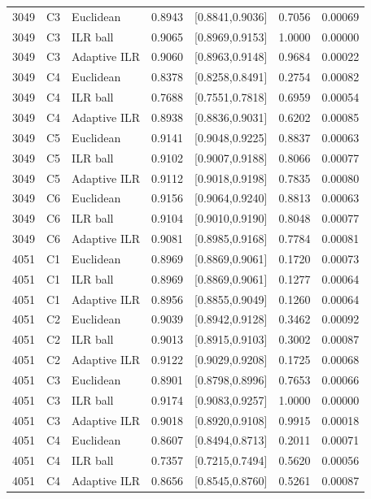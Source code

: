 \begin{longtable}{rrlrrrr}
3049 & C3 & Euclidean & 0.8943 & [0.8841,0.9036] & 0.7056 & 0.00069 \\
3049 & C3 & ILR ball & 0.9065 & [0.8969,0.9153] & 1.0000 & 0.00000 \\
3049 & C3 & Adaptive ILR & 0.9060 & [0.8963,0.9148] & 0.9684 & 0.00022 \\
3049 & C4 & Euclidean & 0.8378 & [0.8258,0.8491] & 0.2754 & 0.00082 \\
3049 & C4 & ILR ball & 0.7688 & [0.7551,0.7818] & 0.6959 & 0.00054 \\
3049 & C4 & Adaptive ILR & 0.8938 & [0.8836,0.9031] & 0.6202 & 0.00085 \\
3049 & C5 & Euclidean & 0.9141 & [0.9048,0.9225] & 0.8837 & 0.00063 \\
3049 & C5 & ILR ball & 0.9102 & [0.9007,0.9188] & 0.8066 & 0.00077 \\
3049 & C5 & Adaptive ILR & 0.9112 & [0.9018,0.9198] & 0.7835 & 0.00080 \\
3049 & C6 & Euclidean & 0.9156 & [0.9064,0.9240] & 0.8813 & 0.00063 \\
3049 & C6 & ILR ball & 0.9104 & [0.9010,0.9190] & 0.8048 & 0.00077 \\
3049 & C6 & Adaptive ILR & 0.9081 & [0.8985,0.9168] & 0.7784 & 0.00081 \\
4051 & C1 & Euclidean & 0.8969 & [0.8869,0.9061] & 0.1720 & 0.00073 \\
4051 & C1 & ILR ball & 0.8969 & [0.8869,0.9061] & 0.1277 & 0.00064 \\
4051 & C1 & Adaptive ILR & 0.8956 & [0.8855,0.9049] & 0.1260 & 0.00064 \\
4051 & C2 & Euclidean & 0.9039 & [0.8942,0.9128] & 0.3462 & 0.00092 \\
4051 & C2 & ILR ball & 0.9013 & [0.8915,0.9103] & 0.3002 & 0.00087 \\
4051 & C2 & Adaptive ILR & 0.9122 & [0.9029,0.9208] & 0.1725 & 0.00068 \\
4051 & C3 & Euclidean & 0.8901 & [0.8798,0.8996] & 0.7653 & 0.00066 \\
4051 & C3 & ILR ball & 0.9174 & [0.9083,0.9257] & 1.0000 & 0.00000 \\
4051 & C3 & Adaptive ILR & 0.9018 & [0.8920,0.9108] & 0.9915 & 0.00018 \\
4051 & C4 & Euclidean & 0.8607 & [0.8494,0.8713] & 0.2011 & 0.00071 \\
4051 & C4 & ILR ball & 0.7357 & [0.7215,0.7494] & 0.5620 & 0.00056 \\
4051 & C4 & Adaptive ILR & 0.8656 & [0.8545,0.8760] & 0.5261 & 0.00087 \\

\end{longtable}
